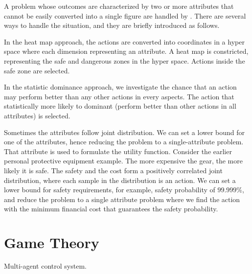 A problem whose outcomes are characterized by two or more attributes that cannot be easily converted into a single figure are handled by . There are several ways to handle the situation, and they are briefly introduced as follows.

In the heat map approach, the actions are converted into coordinates in a hyper space where each dimension representing an attribute. A heat map is constricted, representing the safe and dangerous zones in the hyper space. Actions inside the safe zone are selected.

In the statistic dominance approach, we investigate the chance that an action may perform better than any other actions in every aspects. The action that statistically more likely to dominant (perform better than other actions in all attributes) is selected.

Sometimes the attributes follow joint distribution. We can set a lower bound for one of the attributes, hence reducing the problem to a single-attribute problem. That attribute is used to formulate the utility function. Consider the earlier personal protective equipment example. The more expensive the gear, the more likely it is safe. The safety and the cost form a positively correlated joint distribution, where each sample in the distribution is an action. We can set a lower bound for safety requirements, for example, safety probability of $99.999\%$, and reduce the problem to a single attribute problem where we find the action with the minimum financial cost that guarantees the safety probability.

\section{Game Theory}

Multi-agent control system.